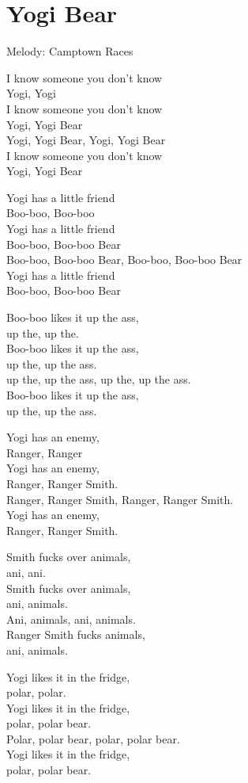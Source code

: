\section{Yogi Bear}
Melody: Camptown Races

I know someone you don't know\\
Yogi, Yogi\\
I know someone you don't know\\
Yogi, Yogi Bear\\
Yogi, Yogi Bear, Yogi, Yogi Bear\\
I know someone you don't know\\
Yogi, Yogi Bear

Yogi has a little friend\\
Boo-boo, Boo-boo\\
Yogi has a little friend\\
Boo-boo, Boo-boo Bear\\
Boo-boo, Boo-boo Bear, Boo-boo, Boo-boo Bear\\
Yogi has a little friend\\
Boo-boo, Boo-boo Bear

Boo-boo likes it up the ass,\\
up the, up the.\\
Boo-boo likes it up the ass,\\
up the, up the ass.\\
up the, up the ass, up the, up the ass.\\
Boo-boo likes it up the ass,\\
up the, up the ass.

Yogi has an enemy,\\
Ranger, Ranger\\
Yogi has an enemy,\\
Ranger, Ranger Smith.\\
Ranger, Ranger Smith, Ranger, Ranger Smith.\\
Yogi has an enemy,\\
Ranger, Ranger Smith.

Smith fucks over animals,\\
ani, ani.\\
Smith fucks over animals,\\
ani, animals.\\
Ani, animals, ani, animals.\\
Ranger Smith fucks animals,\\
ani, animals.

Yogi likes it in the fridge,\\
polar, polar.\\
Yogi likes it in the fridge,\\
polar, polar bear.\\
Polar, polar bear, polar, polar bear.\\
Yogi likes it in the fridge,\\
polar, polar bear.

